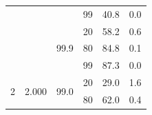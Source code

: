 \documentclass{article}
\begin{document}
\begin{table}
\begin{tabular}{|c|c|c|c|r|r|}
                                    &                                                                                        &                                                                                          & 99                                                                                      & 40.8                                                                      & 0.0                                                                       \\ \cline{3-6} 
                                    &                                                                                        & \multirow{3}{*}{99.9}                                                                    & 20                                                                                      & 58.2                                                                      & 0.6                                                                       \\ \cline{4-6} 
                                    &                                                                                        &                                                                                          & 80                                                                                      & 84.8                                                                      & 0.1                                                                       \\ \cline{4-6} 
                                    &                                                                                        &                                                                                          & 99                                                                                      & 87.3                                                                      & 0.0                                                                       \\ \hline
\multirow{12}{*}{2}                 & \multirow{6}{*}{2.000}                                                                     & \multirow{3}{*}{99.0}                                                                    & 20                                                                                      & 29.0                                                                       & 1.6                                                                       \\ \cline{4-6} 
                                    &                                                                                        &                                                                                          & 80                                                                                      & 62.0                                                                      & 0.4                                                                       \\ \cline{4-6} 

\end{tabular}
\end{table}
\end{document}
